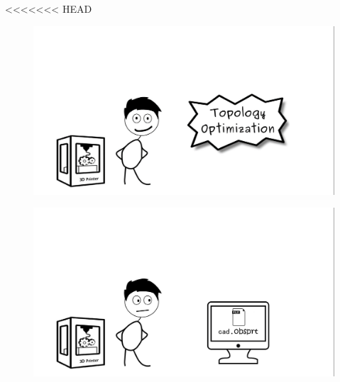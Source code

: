 <<<<<<< HEAD

\begin{frame}
\begin{figure}

\vspace{-.7cm}	
\hspace{-2cm}		\includegraphics[width=1.2\linewidth]{Pictures/animations/animation_1.png}
		\end{figure}

\end{frame}

\begin{frame}
\begin{figure}

\vspace{-.7cm}	
\hspace{-2cm}		\includegraphics[width=1.2\linewidth]{Pictures/animations/animation_2.png}
		\end{figure}

\end{frame}

